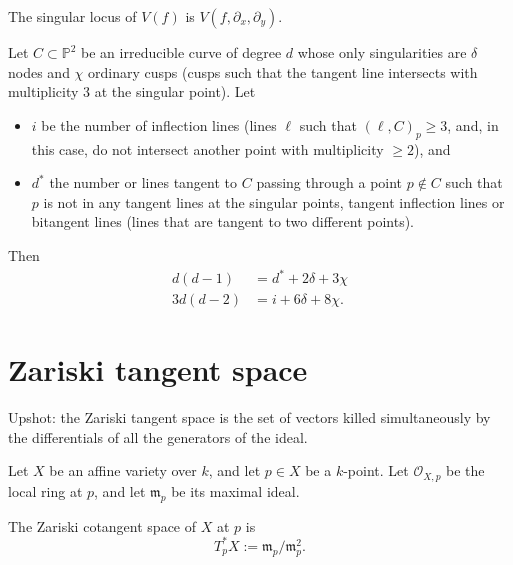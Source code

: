 \noindent
\begin{proposition}
\label{proposition-jacobian-criterion}
The singular locus of $V(f)$ is
$V(f,\partial_x,\partial_y)$.
\end{proposition}



\begin{theorem}
\label{theorem-plucker-formulas} Let $C
\subset \mathbb{P}^2$ be an irreducible curve
of degree $d$ whose only singularities are
$\delta$ nodes and $\chi$ ordinary cusps
(cusps such that the tangent line intersects
with multiplicity 3 at the singular point).
Let \begin{itemize} \item $i$ be the number
of inflection lines (lines $\ell$ such that
$(\ell,C)_p \geq 3$, and, in this case, do
not intersect another point with multiplicity
$\geq 2$), and

\item $d^*$ the number or lines tangent to
$C$ passing through a point $p \not\in C$
such that $p$ is not in any tangent lines at
the singular points, tangent inflection lines
or bitangent lines (lines that are tangent to
two different points). \end{itemize}

\noindent Then $$
\begin{aligned}
d(d-1)&=d^*+2\delta+3\chi\\
3d(d-2)&=i+6\delta+8\chi. \end{aligned}
$$
\end{theorem}


\section{Zariski tangent space}
\label{section-zariski-tangent-space}

\noindent
Upshot: the Zariski tangent space is the set
of vectors killed simultaneously by the
differentials of all the generators of the
ideal.

\medskip\noindent
Let $X$ be an affine variety over $k$,
and let $p\in X$ be a $k$-point.
Let $\mathcal O_{X,p}$ be the local
ring at $p$, and let $\mathfrak m_p$
be its maximal ideal.

\begin{definition}
\label{definition-zariski-cotangent}
The Zariski cotangent space of $X$
at $p$ is
$$
  T_p^*X:=\mathfrak m_p/\mathfrak m_p^2.
$$
\end{definition}

